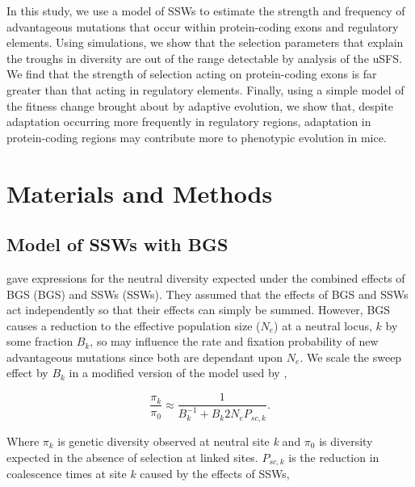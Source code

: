 \documentclass[11pt]{article}
\begin{document}
	In this study, we use a model of SSWs to estimate the strength and frequency of advantageous mutations that occur within protein-coding exons and regulatory elements. Using simulations, we show that the selection parameters that explain the troughs in diversity are out of the range detectable by analysis of the uSFS.  We find that the strength of selection acting on protein-coding exons is far greater than that acting in regulatory elements. Finally, using a simple model of the fitness change brought about by adaptive evolution, we show that, despite adaptation occurring more frequently in regulatory regions, adaptation in protein-coding regions may contribute more to phenotypic evolution in mice.

%
%
\section*{Materials and Methods}

\subsection*{Model of SSWs with BGS}

	\cite{RN290} gave expressions for the neutral diversity expected under the combined effects of BGS (BGS) and SSWs (SSWs). They assumed that the effects of BGS and SSWs act independently so that their effects can simply be summed. However, BGS causes a reduction to the effective population size ($N_e$) at a neutral locus, $k$ by some fraction $B_k$, so may influence the rate and fixation probability of new advantageous mutations since both are dependant upon $N_e$. We scale the sweep effect by $B_k$ in a modified version of the model used by \cite{RN290},
	
\begin{equation}
\label{jointApprox}
\frac{\pi_{k}}{\pi_{0}} \approx  \frac{1}{B_{k}^{-1}  + B_{k}2N_eP_{sc,k}}.
\end{equation}

	Where $\pi_k$ is genetic diversity observed at neutral site \textit{k} and $\pi_0$ is diversity expected in the absence of selection at linked sites. $P_{sc,k}$ is the reduction in coalescence times at site $k$ caused by the effects of SSWs,
\end{document}

